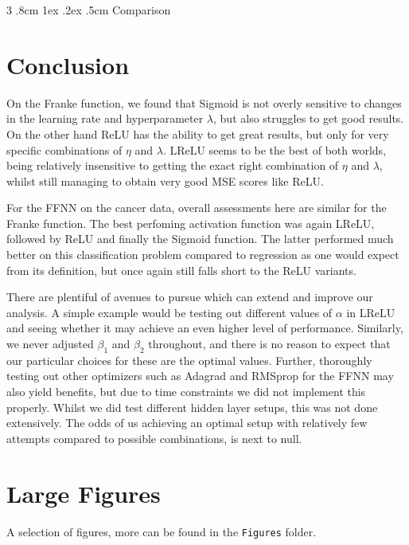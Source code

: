 \documentclass[%
reprint,s
amsmath,amssymb,
aps,
]{revtex4-2}
\makeatletter
\renewcommand{\subsubsection}{%
	\@startsection
	{subsubsection}%
	{3}%
	{\z@}%
	{.8cm \@plus1ex \@minus .2ex}%
	{.5cm}%
	{\normalfont\small\centering}%
}
\makeatother
\begin{document}
\subsubsection{Comparison}

\section{Conclusion}
On the Franke function, we found that Sigmoid is not overly sensitive to changes in the learning rate and hyperparameter $\lambda$, but also struggles to get good results. On the other hand ReLU has the ability to get great results, but only for very specific combinations of $\eta$ and $\lambda$. LReLU seems to be the best of both worlds, being relatively insensitive to getting the exact right combination of $\eta$ and $\lambda$, whilst still managing to obtain very good MSE scores like ReLU.

For the FFNN on the cancer data, overall assessments here are similar for the Franke function. The best perfoming activation function was again LReLU, followed by ReLU and finally the Sigmoid function. The latter performed much better on this classification problem compared to regression as one would expect from its definition, but once again still falls short to the ReLU variants.

There are plentiful of avenues to pursue which can extend and improve our analysis. A simple example would be testing out different values of $\alpha$ in LReLU and seeing whether it may achieve an even higher level of performance. Similarly, we never adjusted $\beta_1$ and $\beta_2$ throughout, and there is no reason to expect that our particular choices for these are the optimal values. Further, thoroughly testing out other optimizers such as Adagrad and RMSprop for the FFNN may also yield benefits, but due to time constraints we did not implement this properly. Whilst we did test different hidden layer setups, this was not done extensively. The odds of us achieving an optimal setup with relatively few attempts compared to possible combinations, is next to null. 




\appendix
\section{Large Figures}
\label{Appendix:A}
A selection of figures, more can be found in the \texttt{Figures} folder.
\end{document}
